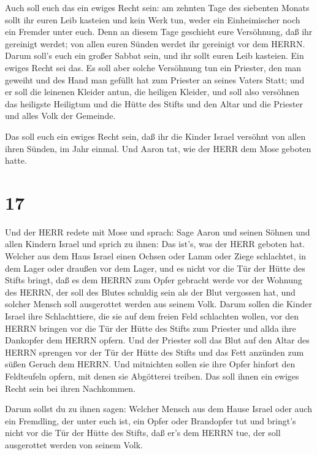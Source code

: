  Auch soll euch das ein ewiges Recht sein: am zehnten Tage
des siebenten Monats sollt ihr euren Leib kasteien und kein Werk tun,
weder ein Einheimischer noch ein Fremder unter euch.  Denn
an diesem Tage geschieht eure Versöhnung, daß ihr gereinigt werdet; von
allen euren Sünden werdet ihr gereinigt vor dem HERRN. 
Darum soll's euch ein großer Sabbat sein, und ihr sollt euren Leib
kasteien. Ein ewiges Recht sei das.  Es soll aber solche
Versöhnung tun ein Priester, den man geweiht und des Hand man gefüllt
hat zum Priester an seines Vaters Statt; und er soll die leinenen
Kleider antun, die heiligen Kleider,  und soll also
versöhnen das heiligste Heiligtum und die Hütte des Stifts und den Altar
und die Priester und alles Volk der Gemeinde.

 Das soll euch ein ewiges Recht sein, daß ihr die Kinder
Israel versöhnt von allen ihren Sünden, im Jahr einmal. Und Aaron tat,
wie der HERR dem Mose geboten hatte.

\hypertarget{section-16}{%
\section{17}\label{section-16}}

 Und der HERR redete mit Mose und sprach:  Sage
Aaron und seinen Söhnen und allen Kindern Israel und sprich zu ihnen:
Das ist's, was der HERR geboten hat.  Welcher aus dem Haus
Israel einen Ochsen oder Lamm oder Ziege schlachtet, in dem Lager oder
draußen vor dem Lager,  und es nicht vor die Tür der Hütte
des Stifts bringt, daß es dem HERRN zum Opfer gebracht werde vor der
Wohnung des HERRN, der soll des Blutes schuldig sein als der Blut
vergossen hat, und solcher Mensch soll ausgerottet werden aus seinem
Volk.  Darum sollen die Kinder Israel ihre Schlachttiere,
die sie auf dem freien Feld schlachten wollen, vor den HERRN bringen vor
die Tür der Hütte des Stifts zum Priester und allda ihre Dankopfer dem
HERRN opfern.  Und der Priester soll das Blut auf den Altar
des HERRN sprengen vor der Tür der Hütte des Stifts und das Fett
anzünden zum süßen Geruch dem HERRN.  Und mitnichten sollen
sie ihre Opfer hinfort den Feldteufeln opfern, mit denen sie Abgötterei
treiben. Das soll ihnen ein ewiges Recht sein bei ihren Nachkommen.

 Darum sollst du zu ihnen sagen: Welcher Mensch aus dem
Hause Israel oder auch ein Fremdling, der unter euch ist, ein Opfer oder
Brandopfer tut  und bringt's nicht vor die Tür der Hütte des
Stifts, daß er's dem HERRN tue, der soll ausgerottet werden von seinem
Volk.

